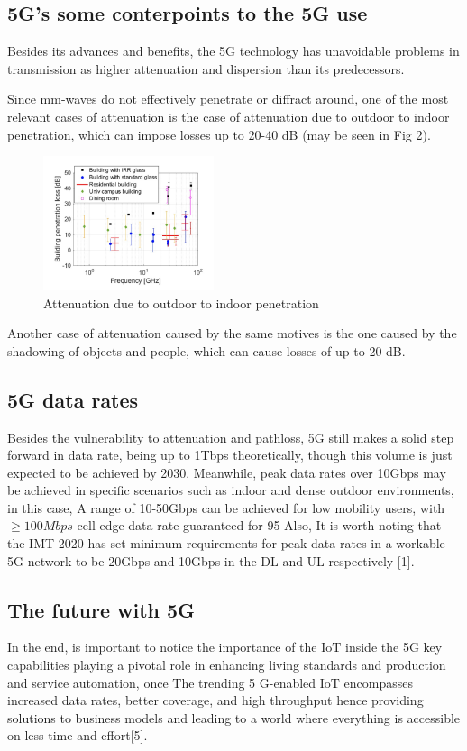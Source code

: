 \documentclass[10pt,journal,compsoc]{IEEEtran}
\begin{document}
\subsection*{5G's some conterpoints to the 5G use}
Besides its advances and benefits, the 5G technology has unavoidable problems in transmission as higher attenuation and dispersion than its predecessors.\par
Since mm-waves do not effectively penetrate or diffract around, one of the most relevant cases of attenuation is the case of attenuation due to outdoor to indoor penetration, which can impose losses up to 20-40 dB (may be seen in Fig 2).\par
\begin{figure}[h]
\centering
\includegraphics[width=5cm]{Fig1.png}
\caption{Attenuation due to outdoor to indoor penetration}
\end{figure}
Another case of attenuation caused by the same motives is the one caused by the shadowing of objects and people, which can cause losses of up to 20 dB.\par
\subsection*{5G data rates}
Besides the vulnerability to attenuation and pathloss, 5G still makes a solid step forward in data rate, being up to 1Tbps theoretically, though this volume is just expected to be achieved by 2030. Meanwhile, peak data rates over 10Gbps may be achieved in specific scenarios such as indoor and dense outdoor environments, in this case, A range of 10-50Gbps can be achieved for low mobility users, with $\geq 100Mbps$ cell-edge data rate guaranteed for 95%
Also, It is worth noting that the IMT-2020 has set minimum requirements for peak data rates in a workable 5G network to be 20Gbps and 10Gbps in the DL and UL respectively [1].

\subsection*{The future with 5G}
In the end, is important to notice the importance of the IoT inside the 5G key capabilities playing a pivotal role in enhancing living standards and production and service automation, once The trending 5 G-enabled IoT encompasses increased data rates, better coverage, and high throughput hence providing solutions to business models and leading to a world where everything is accessible on less time and effort[5].
\end{document}
